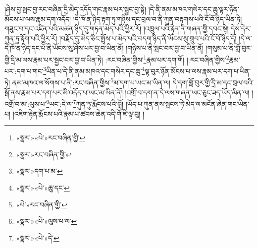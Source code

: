 །ཤེས་བྱ་སྤང་བྱ་རང་བཞིན་དྲི་མེད་འདོད་གང་རྣམ་པར་སྦྱང་བྱ་སྟེ། །དེ་ནི་ནམ་མཁའ་གསེར་དང་ཆུ་ལྟར་ཉོན་མོངས་པ་ལས་རྣམ་དག་འདོད། །དེ་ཁོ་ན་ཉིད་རྟག་ཏུ་གཉིས་དང་བྲལ་བ་ནི་ཀུན་བརྟགས་པའི་ངོ་བོ་ཉིད་ཡིན་ཏེ། གཟུང་བ་དང་འཛིན་པའི་མཚན་ཉིད་དུ་གཏན་མེད་པའི་ཕྱིར་རོ། །འཁྲུལ་པའི་རྟེན་ནི་གཞན་གྱི་དབང་སྟེ། དེས་དེར་ཀུན་ཏུ་རྟོག་པའི་ཕྱིར་རོ། །བརྗོད་དུ་མེད་ཅིང་སྤྲོས་པ་མེད་པའི་བདག་ཉིད་ནི་ཡོངས་སུ་གྲུབ་པའི་ངོ་བོ་ཉིད་དོ། །དེ་ལ་དེ་ཁོ་ན་ཉིད་དང་པོ་ནི་ཡོངས་སུ་ཤེས་པར་བྱ་བ་ཡིན་ནོ། །གཉིས་པ་ནི་སྤང་བར་བྱ་བ་ཡིན་ནོ། །གསུམ་པ་ནི་གློ་བུར་གྱི་དྲི་མ་ལས་རྣམ་པར་སྦྱང་བར་བྱ་བ་ཡིན་ཏེ། :རང་བཞིན་གྱིས་\footnote{«སྣར་»«པེ་»རང་བཞིན་གྱི་}རྣམ་པར་དག་གོ། །:རང་བཞིན་གྱིས་\footnote{«སྣར་»རང་བཞིན་གྱི་}རྣམ་པར་:དག་པ་གང་\footnote{«སྣར་»དག་པ་མ་}ཡིན་པ་དེ་ནི་ནམ་མཁའ་དང་གསེར་དང་ཆུ་\footnote{«སྣར་»«པེ་»ཆུ་དང་}ལྟ་བུར་ཉོན་མོངས་པ་ལས་རྣམ་པར་དག་པ་ཡིན་ཏེ། ནམ་མཁའ་ལ་སོགས་པ་ནི་:རང་བཞིན་གྱིས་\footnote{«པེ་»རང་བཞིན་གྱི་}མ་དག་པ་ཡང་མ་ཡིན་ལ། དེ་དག་གློ་བུར་གྱི་དྲི་མ་དང་བྲལ་བའི་སྒོ་ནས་རྣམ་པར་དག་པར་མི་འདོད་པ་ཡང་མ་ཡིན་ནོ། །འགྲོ་བ་དག་ན་དེ་ལས་གཞན་ཡང་ཅུང་ཟད་ཡོད་མིན་ལ། །འགྲོ་བ་མ་:ལུས་པ་\footnote{«སྣར་»«པེ་»ལུས་པ་ལ་}ཡང་:དེ་ལ་\footnote{«སྣར་»«པེ་»དེ་}ཀུན་ཏུ་རྨོངས་པའི་བློ། །ཡོད་པ་ཀུན་ནས་སྤངས་ཏེ་མེད་ལ་མངོན་ཞེན་གང་ཡིན་པ། །འཇིག་རྟེན་རྨོངས་པའི་རྣམ་པ་ཚབས་ཆེན་འདི་གོ་ཇི་ལྟ་བུ། །
